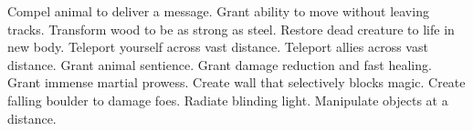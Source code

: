     {Compel animal to deliver a message.}
    {Grant ability to move without leaving tracks.}
    {Transform wood to be as strong as steel.}
    {Restore dead creature to life in new body.}
    {Teleport yourself across vast distance.}
    {Teleport allies across vast distance.}
    {Grant animal sentience.}
    {Grant damage reduction and fast healing.}
    {Grant immense martial prowess.}
    {Create wall that selectively blocks magic.}
    {Create falling boulder to damage foes.}
    {Radiate blinding light.}
    {Manipulate objects at a distance.}





